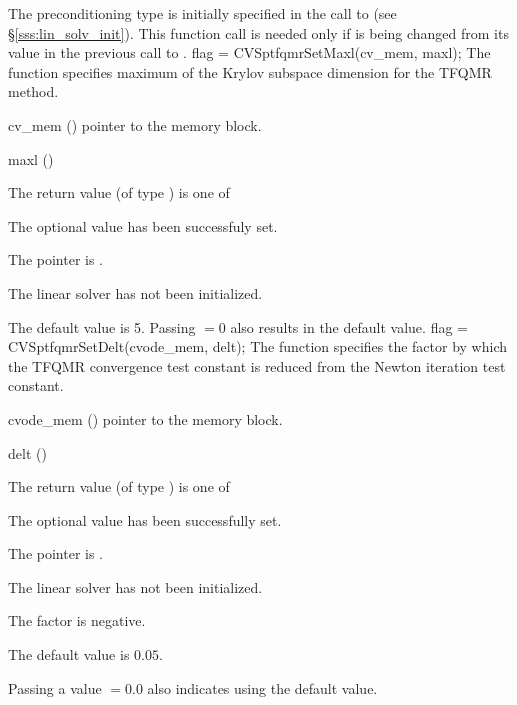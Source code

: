 {
  The preconditioning type is initially specified in the call
  to  (see \S\ref{sss:lin_solv_init}). This function call is
  needed only if  is being changed from its value in the
  previous call to .
}
{
  flag = CVSptfqmrSetMaxl(cv\_mem, maxl);
}
{
  The function  specifies maximum of the Krylov subspace
  dimension for the TFQMR method.
}
{
  \begin{args}[cv\_mem]
  \item[cv\_mem] ()
    pointer to the {\cvode} memory block.
  \item[maxl] ()

  \end{args}
}
{
  The return value  (of type ) is one of
  \begin{args}
  \item[\Id{CVSPTFQMR\_SUCCESS}] 
    The optional value has been successfuly set.
  \item[\Id{CVSPTFQMR\_MEM\_NULL}]
    The  pointer is .
  \item[\Id{CVSPTFQMR\_LMEM\_NULL}]
    The {\cvsptfqmr} linear solver has not been initialized.
  \end{args}
}
{
  The default value is 5.  Passing  $= 0$ also results in the
  default value. 
}
{
  flag = CVSptfqmrSetDelt(cvode\_mem, delt);
}
{
  The function  specifies the factor by
  which the TFQMR convergence test constant is reduced
  from the Newton iteration test constant.
}
{
  \begin{args}
  \item[cvode\_mem] ()
    pointer to the {\cvode} memory block.
  \item[delt] ()

  \end{args}
}
{
  The return value  (of type ) is one of
  \begin{args}
  \item[\Id{CVSPTFQMR\_SUCCESS}] 
    The optional value has been successfully set.
  \item[\Id{CVSPTFQMR\_MEM\_NULL}]
    The  pointer is .
  \item[\Id{CVSPTFQMR\_LMEM\_NULL}]
    The {\cvsptfqmr} linear solver has not been initialized.
  \item[\Id{CVSPTFQMR\_ILL\_INPUT}]
    The factor  is negative.  
  \end{args}
}
{
  The default value is $0.05$.

  Passing a value $ = 0.0$ also indicates using the default value.
}

